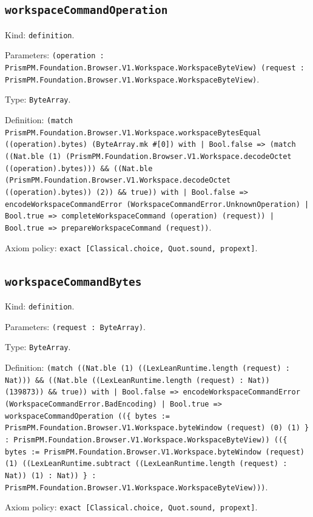 \documentclass[11pt]{article}
\begin{document}
\subsection*{\texttt{workspaceCommandOperation}}
\noindent Kind: \texttt{definition}.\par
\noindent Parameters: \texttt{(operation : PrismPM.Foundation.Browser.V1.Workspace.WorkspaceByteView) (request : PrismPM.Foundation.Browser.V1.Workspace.WorkspaceByteView)}.\par
\noindent Type: \texttt{ByteArray}.\par
\noindent Definition: \texttt{(match PrismPM.Foundation.Browser.V1.Workspace.workspaceBytesEqual ((operation).bytes) (ByteArray.mk \#[0]) with | Bool.false => (match ((Nat.ble (1) (PrismPM.Foundation.Browser.V1.Workspace.decodeOctet ((operation).bytes))) \&\& ((Nat.ble (PrismPM.Foundation.Browser.V1.Workspace.decodeOctet ((operation).bytes)) (2)) \&\& true)) with | Bool.false => encodeWorkspaceCommandError (WorkspaceCommandError.UnknownOperation) | Bool.true => completeWorkspaceCommand (operation) (request)) | Bool.true => prepareWorkspaceCommand (request))}.\par
\noindent Axiom policy: \texttt{exact [Classical.choice, Quot.sound, propext]}.\par
\subsection*{\texttt{workspaceCommandBytes}}
\noindent Kind: \texttt{definition}.\par
\noindent Parameters: \texttt{(request : ByteArray)}.\par
\noindent Type: \texttt{ByteArray}.\par
\noindent Definition: \texttt{(match ((Nat.ble (1) ((LexLeanRuntime.length (request) : Nat))) \&\& ((Nat.ble ((LexLeanRuntime.length (request) : Nat)) (139873)) \&\& true)) with | Bool.false => encodeWorkspaceCommandError (WorkspaceCommandError.BadEncoding) | Bool.true => workspaceCommandOperation ((\{ bytes := PrismPM.Foundation.Browser.V1.Workspace.byteWindow (request) (0) (1) \} : PrismPM.Foundation.Browser.V1.Workspace.WorkspaceByteView)) ((\{ bytes := PrismPM.Foundation.Browser.V1.Workspace.byteWindow (request) (1) ((LexLeanRuntime.subtract ((LexLeanRuntime.length (request) : Nat)) (1) : Nat)) \} : PrismPM.Foundation.Browser.V1.Workspace.WorkspaceByteView)))}.\par
\noindent Axiom policy: \texttt{exact [Classical.choice, Quot.sound, propext]}.\par
\end{document}
